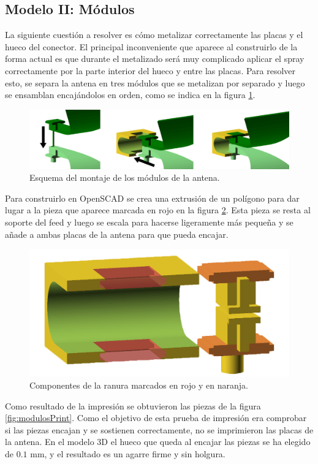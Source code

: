 \documentclass[11pt,a4paper,twoside,pdf]{article}
\numberwithin{equation}{section}
\begin{document}
\subsection{Modelo II: Módulos}

La siguiente cuestión a resolver es cómo metalizar correctamente las placas y el hueco del conector. El principal inconveniente que aparece al construirlo de la forma actual es que durante el metalizado será muy complicado aplicar el spray correctamente por la parte interior del hueco y entre las placas. Para resolver esto, se separa la antena en tres módulos que se metalizan por separado y luego se ensamblan encajándolos en orden, como se indica en la figura \ref{fig:modulos}.
\begin{figure}[!h]
    \centering
    \includegraphics[width=\linewidth]{img/modelos/2025_02_25-Ranuras/cunias.png}
    \caption{Esquema del montaje de los módulos de la antena.}
    \label{fig:modulos}
\end{figure}

Para construirlo en OpenSCAD se crea una extrusión de un polígono para dar lugar a la pieza que aparece marcada en rojo en la figura \ref{fig:molde}. Esta pieza se resta al soporte del feed y luego se escala para hacerse ligeramente más pequeña y se añade a ambas placas de la antena para que pueda encajar.
\begin{figure}[!h]
    \centering
    \includegraphics[width=0.7\linewidth]{img/modelos/2025_02_25-Ranuras/molde.png}
    \caption{Componentes de la ranura marcados en rojo y en naranja.}
    \label{fig:molde}
\end{figure}

Como resultado de la impresión se obtuvieron las piezas de la figura \ref{fig:modulosPrint}. Como el objetivo de esta prueba de impresión era comprobar si las piezas encajan y se sostienen correctamente, no se imprimieron las placas de la antena. En el modelo 3D el hueco que queda al encajar las piezas se ha elegido de $0.1$ mm, y el resultado es un agarre firme y sin holgura.
\end{document}
